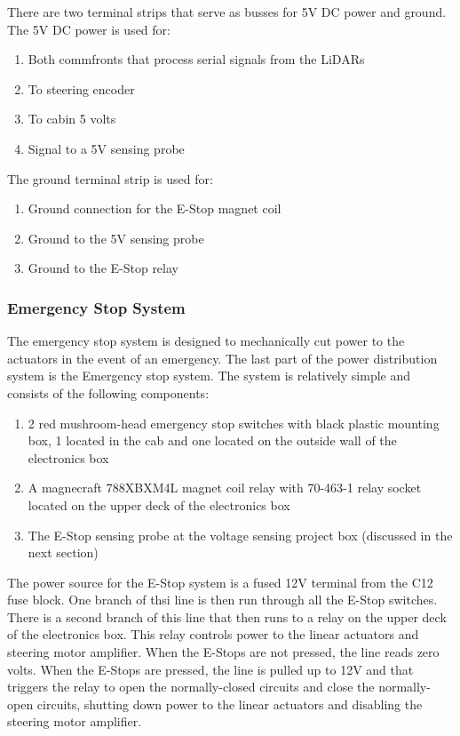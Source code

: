 There are two terminal strips that serve as busses for 5V DC power and ground.  The 5V DC power is used for:

\begin{enumerate}
\item Both commfronts that process serial signals from the LiDARs
\item To steering encoder
\item To cabin 5 volts
\item Signal to a 5V sensing probe
\end{enumerate}

\noindent The ground terminal strip is used for:

\begin{enumerate}
\item Ground connection for the E-Stop magnet coil
\item Ground to the 5V sensing probe
\item Ground to the E-Stop relay
\end{enumerate}

\newpage

\subsubsection{Emergency Stop System}

The emergency stop system is designed to mechanically cut power to the actuators in the event of an emergency. The last part of the power distribution system is the Emergency stop system. The system is relatively simple and consists of the following components:\\

\begin{enumerate}
\item 2 red mushroom-head emergency stop switches with black plastic mounting box, 1 located in the cab and one located on the outside wall of the electronics box
\item A magnecraft 788XBXM4L magnet coil relay with 70-463-1 relay socket located on the upper deck of the electronics box
\item The E-Stop sensing probe at the voltage sensing project box (discussed in the next section)
\end{enumerate}

\noindent The power source for the E-Stop system is a fused 12V terminal from the C12 fuse block. One branch of thsi line is then run through all the E-Stop switches. There is a second branch of this line that then runs to a relay on the upper deck of the electronics box. This relay controls power to the linear actuators and steering motor amplifier. When the E-Stops are not pressed, the line reads zero volts. When the E-Stops are pressed, the line is pulled up to 12V and that triggers the relay to open the normally-closed circuits and close the normally-open circuits, shutting down power to the linear actuators and disabling the steering motor amplifier.

